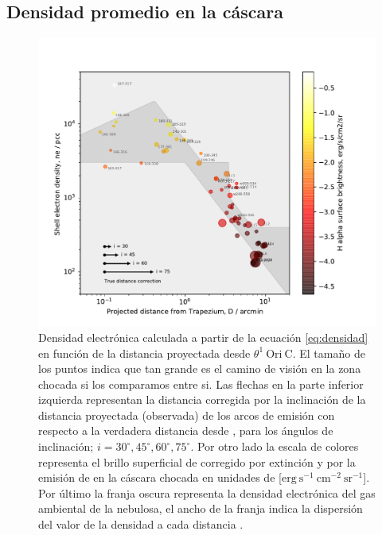 \subsection{Densidad promedio en la cáscara}
\label{sec:density}

\begin{figure}
  \centering
   \includegraphics[width=\linewidth, clip]{luis-programas/will-nshell-vs-D.pdf}
  \caption{Densidad electrónica calculada a partir de la ecuación \ref{eq:densidad} en función de la distancia proyectada desde \(\theta^1\ \text{Ori}\ \text{C}\). El tamaño de los puntos indica que tan grande es el camino de visión en la zona chocada si los comparamos entre si. Las flechas en la parte inferior izquierda representan la distancia corregida por la inclinación de la distancia proyectada (observada) de los arcos de emisión con respecto a la verdadera distancia desde \thC{}, para los ángulos de inclinación; \(i = 30^{\circ}, 45^{\circ}, 60^{\circ}, 75^{\circ}\). Por otro lado la escala de colores representa el brillo superficial de \ha{} corregido por extinción y por la emisión de \nii{} en la cáscara chocada en unidades de [\(\mathrm{erg~s^{-1}~cm^{-2}~sr^{-1}}\)]. Por último la franja oscura representa la densidad electrónica del gas ambiental de la nebulosa, el ancho de la franja indica la dispersión del valor de la densidad a cada distancia \citep{Odell:2010, Mesa:2008}.}
  \label{fig:density}
\end{figure}

